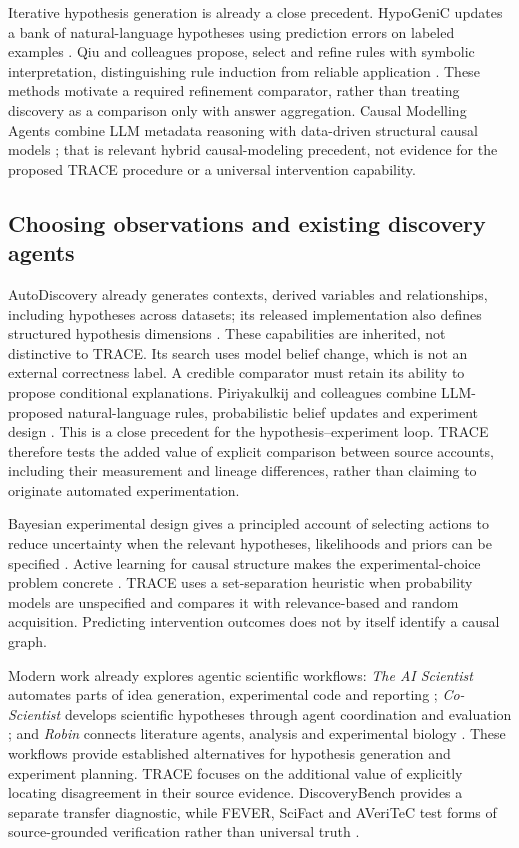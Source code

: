 \documentclass[11pt,a4paper]{article}
\begin{document}
Iterative hypothesis generation is already a close precedent. HypoGeniC
updates a bank of natural-language hypotheses using prediction errors on
labeled examples \citep{R37}. Qiu and colleagues propose, select and
refine rules with symbolic interpretation, distinguishing rule induction
from reliable application \citep{R38}. These methods motivate a required
refinement comparator, rather than treating discovery as a comparison
only with answer aggregation. Causal Modelling Agents combine LLM
metadata reasoning with data-driven structural causal models
\citep{R39}; that is relevant hybrid causal-modeling precedent, not
evidence for the proposed TRACE procedure or a universal intervention
capability.

\subsection{Choosing observations and existing discovery
agents}\label{choosing-observations-and-existing-discovery-agents}

AutoDiscovery already generates contexts, derived variables and
relationships, including hypotheses across datasets; its released
implementation also defines structured hypothesis dimensions
\citep{R50}. These capabilities are inherited, not distinctive to TRACE.
Its search uses model belief change, which is not an external
correctness label. A credible comparator must retain its ability to
propose conditional explanations. Piriyakulkij and colleagues combine
LLM-proposed natural-language rules, probabilistic belief updates and
experiment design \citep{R40}. This is a close precedent for the
hypothesis--experiment loop. TRACE therefore tests the added value of
explicit comparison between source accounts, including their measurement
and lineage differences, rather than claiming to originate automated
experimentation.

Bayesian experimental design gives a principled account of selecting
actions to reduce uncertainty when the relevant hypotheses, likelihoods
and priors can be specified \citep{R20}. Active learning for causal
structure makes the experimental-choice problem concrete \citep{R31}.
TRACE uses a set-separation heuristic when probability models are
unspecified and compares it with relevance-based and random acquisition.
Predicting intervention outcomes does not by itself identify a causal
graph.

Modern work already explores agentic scientific workflows: \emph{The AI
Scientist} automates parts of idea generation, experimental code and
reporting \citep{R34}; \emph{Co-Scientist} develops scientific
hypotheses through agent coordination and evaluation \citep{R35}; and
\emph{Robin} connects literature agents, analysis and experimental
biology \citep{R36}. These workflows provide established alternatives
for hypothesis generation and experiment planning. TRACE focuses on the
additional value of explicitly locating disagreement in their source
evidence. DiscoveryBench provides a separate transfer diagnostic, while
FEVER, SciFact and AVeriTeC test forms of source-grounded verification
rather than universal truth \citep{R25, R26, R27, R28}.
\end{document}
